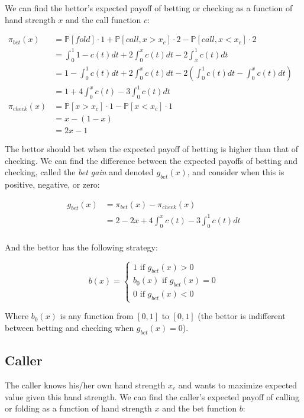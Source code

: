 \documentclass[a4paper,12pt]{article}
\begin{document}
We can find the bettor's expected payoff of betting or checking as a function of hand strength $x$ and the call function $c$:

\begin{align*}
	\pi_{bet}(x) & = \mathbb{P}[fold] \cdot 1 + \mathbb{P}[call, x > x_c] \cdot 2 - \mathbb{P}[call, x < x_c] \cdot 2 \\
    & = \int_{0}^{1} 1 - c(t) dt + 2 \int_{0}^{x} c(t) dt - 2 \int_{x}^{1} c(t) dt \\
    & = 1 - \int_{0}^{1} c(t) dt + 2 \int_{0}^{x} c(t) dt - 2 \left( \int_{0}^{1} c(t) dt - \int_{0}^{x} c(t) dt \right) \\
    & = 1 + 4 \int_{0}^{x} c(t) - 3 \int_{0}^{1} c(t) dt
    & \\
	\pi_{check}(x) & = \mathbb{P}[x > x_c] \cdot 1 - \mathbb{P}[x < x_c] \cdot 1\\
    &= x - (1-x) \\ 
    &= 2x - 1
\end{align*}

The bettor should bet when the expected payoff of betting is higher than that of checking. We can find the difference between the expected payoffs of betting and checking, called the \textit{bet gain} and denoted $g_{bet}(x)$, and consider when this is positive, negative, or zero:

\begin{align*}
    g_{bet}(x) &= \pi_{bet}(x) - \pi_{check}(x) \\
    & = 2 - 2x + 4 \int_{0}^{x} c(t) - 3 \int_{0}^{1} c(t) dt \\
 \end{align*}

 And the bettor has the following strategy:
 
 \[
b(x) = \begin{cases}
    1 \text{ if } g_{bet}(x) > 0 \\
    b_0(x) \text{ if } g_{bet}(x) = 0 \\
    0 \text{ if } g_{bet}(x) < 0
\end{cases}
\]

Where $b_0(x)$ is any function from $[0, 1]$ to $[0, 1]$ (the bettor is indifferent between betting and checking when $g_{bet}(x)=0$).

\subsection{Caller}

The caller knows his/her own hand strength $x_c$ and wants to maximize expected value given this hand strength. We can find the caller's expected payoff of calling or folding as a function of hand strength $x$ and the bet function $b$:
\end{document}
